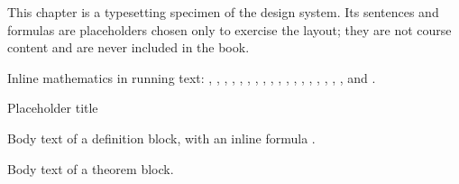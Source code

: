 \ELhold


\begin{ELunit}

This chapter is a typesetting specimen of the design system. Its sentences and formulas are placeholders chosen only to exercise the layout; they are not course content and are never included in the book.

Inline mathematics in running text: , , , , \ELim{\theta}, \ELim{\phi}, \ELim{\rho}, , , , , , \ELim{\sin\theta}, \ELim{\cos\phi}, , , , ,  and .

\end{ELunit}

\ELhold


\begin{ELunit}




\end{ELunit}

\ELhold


\begin{ELdefinition}{Placeholder title}

Body text of a definition block, with an inline formula .

\end{ELdefinition}

\begin{ELtheorem}{}

Body text of a theorem block.

\end{ELtheorem}

